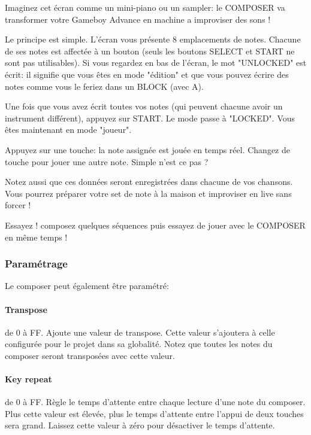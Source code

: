 Imaginez cet écran comme un mini-piano ou un sampler: le COMPOSER va transformer votre Gameboy Advance en machine a improviser des sons !


Le principe est simple.
L'écran vous présente 8 emplacements de notes.
Chacune de ses notes est affectée à un bouton (seuls les boutons SELECT et START ne sont pas utilisables).
Si vous regardez en bas de l'écran, le mot "UNLOCKED" est écrit:
    il signifie que vous êtes en mode "édition" et que vous pouvez écrire des notes comme vous le feriez dans un BLOCK (avec A).
\medskip

Une fois que vous avez écrit toutes vos notes (qui peuvent chacune avoir un instrument différent), appuyez sur START.
Le mode passe à "LOCKED". Vous êtes maintenant en mode "joueur".
\medskip

Appuyez sur une touche: la note assignée est jouée en temps réel.
Changez de touche pour jouer une autre note. Simple n'est ce pas ?
\medskip

Notez aussi que ces données seront enregistrées dans chacune de vos chansons.
Vous pourrez préparer votre set de note à la maison et improviser en live sans forcer !
\medskip

Essayez ! composez quelques séquences puis essayez de jouer avec le COMPOSER en même temps !
\medskip

\subsubsection{Paramétrage}

Le composer peut également être paramétré:


\paragraph{Transpose} de 0 à FF.
Ajoute une valeur de transpose.
Cette valeur s'ajoutera à celle configurée pour le projet dans sa globalité.
Notez que toutes les notes du composer seront transposées avec cette valeur.

\paragraph{Key repeat} de 0 à FF.
Règle le temps d'attente entre chaque lecture d'une note du composer.
Plus cette valeur est élevée, plus le temps d'attente entre l'appui de deux touches sera grand.
Laissez cette valeur à zéro pour désactiver le temps d'attente.

